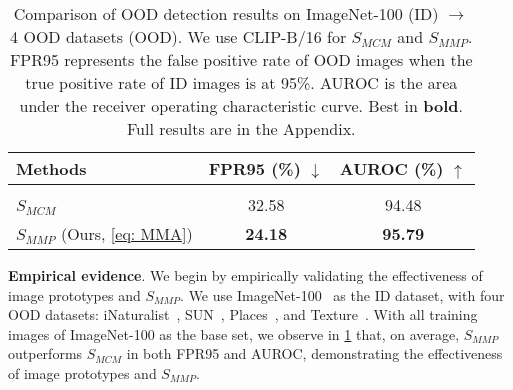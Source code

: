 \begin{table}[t!]
\centering
\begin{tabular}{l|cc}
\toprule
Methods    & FPR95 (\%) $\downarrow$   & AUROC (\%) $\uparrow$  \\
\midrule
\rowcolor[gray]{.9} \multicolumn{3}{c}{ImageNet-100 $\rightarrow$ 4 Datasets (Average)} \\
$S_{\textit{MCM}}$~\cite{ming2022delving}        & 32.58                & 94.48             \\
\rowcolor{green!10} $S_{\textit{MMP}}$ (Ours, \cref{eq: MMA})        & \textbf{24.18}                & \textbf{95.79}            \\
\bottomrule
\end{tabular}%
\vspace{-1em}
\caption{
Comparison of OOD detection results on ImageNet-100 (ID) $\rightarrow$ 4 OOD datasets (OOD). 
We use CLIP-B/16 for $S_{\textit{MCM}}$ and $S_{\textit{MMP}}$. 
FPR95 represents the false positive rate of OOD images when the true positive rate of ID images is at 95\%. 
AUROC is the area under the
receiver operating characteristic curve.
Best in \textbf{bold}. Full results are in the Appendix.
}\label{tab: MMA}
\vspace{-0.6em}
\end{table}

\noindent
\textbf{Empirical evidence}. 
We begin by empirically validating the effectiveness of image prototypes and $S_{\textit{MMP}}$. 
We use ImageNet-100~\cite{dengImageNetLargescaleHierarchical2009} as the ID dataset, with four OOD datasets:  iNaturalist~\cite{van_horn_inaturalist_2018}, SUN~\cite{xiao_sun_2010}, Places~\cite{zhou_places_2018}, and Texture~\cite{cimpoi_describing_2014}. 
With all training images of ImageNet-100 as the base set, we observe in \cref{tab: MMA} that, on average, $S_{\textit{MMP}}$ outperforms $S_{\textit{MCM}}$ in both FPR95 and AUROC, demonstrating the effectiveness of image prototypes and $S_{\textit{MMP}}$.

